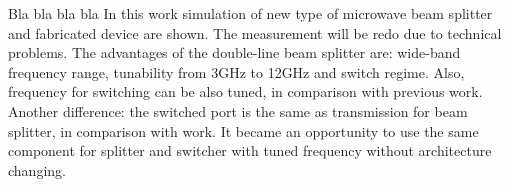 \documentclass[a0paper,portrait]{baposter}
\begin{document}
\begin{poster}



{\small{Bla bla bla bla In this work simulation of new type of microwave beam splitter and fabricated device are shown. The measurement will be redo due to technical problems. The advantages of the double-line beam splitter are: wide-band frequency range, tunability from 3GHz to 12GHz and switch regime. Also, frequency for switching can be also tuned, in comparison with previous work\cite{pechal2016superconducting}. Another difference: the switched port is the same as transmission for beam splitter, in comparison with work\cite{pechal2016superconducting}. It became an opportunity to use the same component for splitter and switcher with tuned frequency without architecture changing.}}



\end{poster}
\end{document}
